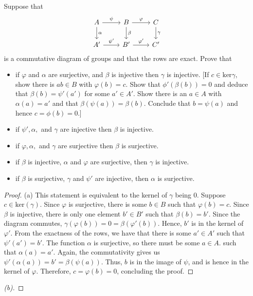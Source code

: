 \documentclass[10pt]{article}
\newenvironment{problem}[2][Problem]{\begin{trivlist}
		\item[\hskip \labelsep {\bfseries #1}\hskip \labelsep {\bfseries #2.}]}{\end{trivlist}}
\begin{document}
	\begin{problem}{5.1}
		Suppose that
		\[ \begin{tikzcd}
			A \arrow{d}{\alpha} \arrow{r}{\psi} & B \arrow{d}{\beta} \arrow{r}{\varphi} & C \arrow{d}{\gamma} \\%
			A' \arrow{r}{\psi'} & B' \arrow{r}{\varphi'} & C'
		\end{tikzcd}
		\]
		is a commutative diagram of groups and that the rows are exact. Prove that
		\begin{itemize}
			\item[\textbf{(a)}] if $\varphi$ and $\alpha$ are surjective, and $\beta$ is injective then $\gamma$ is injective. [If $c \in \text{ker}\gamma$, show there is $a b \in B$ with $\varphi(b) = c$. Show that $\phi'(\beta(b)) = 0$ and deduce that $\beta(b) = \psi'(a')$ for some $a' \in A'$. Show there is an $a \in A$ with $\alpha(a) = a'$ and that $\beta(\psi(a)) = \beta(b)$. Conclude that $b = \psi(a)$ and hence $c = \phi(b) = 0$.]
			\item[\textbf{(b)}] if $\psi', \alpha,$ and $\gamma$ are injective then $\beta$ is injective.
			\item[\textbf{(c)}] if $\varphi, \alpha,$ and $\gamma$ are surjective then $\beta$ is surjective.
			\item[\textbf{(d)}] if $\beta$ is injective, $\alpha$ and $\varphi$ are surjective, then $\gamma$ is injective.
			\item[\textbf{(e)}] if $\beta$ is surjective, $\gamma$ and $\psi'$ are injective, then $\alpha$ is surjective.
		\end{itemize}
		\begin{proof}{(a)}
			This statement is equivalent to the kernel of $\gamma$ being $0$. Suppose $c \in \text{ker}(\gamma)$. Since $\varphi$ is surjective, there is some $b \in B$ such that $\varphi(b) = c$. Since $\beta$ is injective, there is only one element $b' \in B'$ such that $\beta(b) = b'$. Since the diagram commutes, $\gamma(\varphi(b)) = 0 = \beta(\varphi'(b))$. Hence, $b'$ is in the kernel of $\varphi'$. From the exactness of the rows, we have that there is some $a' \in A'$ such that $\psi'(a') = b'$. The function $\alpha$ is surjective, so there must be some $a \in A$. such that $\alpha(a) = a'$. Again, the commutativity gives us $\psi'(\alpha(a)) = b' = \beta(\psi(a))$. Thus, $b$ is in the image of $\psi$, and is hence in the kernel of $\varphi$. Therefore, $c = \varphi(b) = 0$, concluding the proof.
		\end{proof}
		\begin{proof}[(b)]

\end{proof}
\end{problem}
\end{document}

